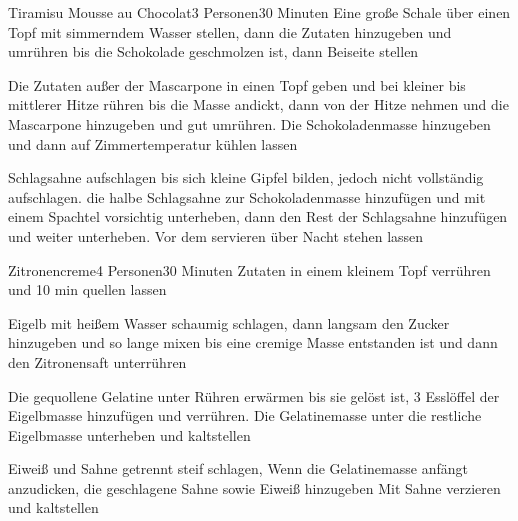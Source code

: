 \begin{recipe}{Tiramisu Mousse au Chocolat}{3 Personen}{30 Minuten}
Eine große Schale über einen Topf mit simmerndem Wasser stellen, dann die Zutaten hinzugeben und umrühren bis die Schokolade geschmolzen ist, dann Beiseite stellen

Die Zutaten außer der Mascarpone in einen Topf geben und bei kleiner bis mittlerer Hitze rühren bis die Masse andickt, dann von der Hitze nehmen und die Mascarpone hinzugeben und gut umrühren.
Die Schokoladenmasse hinzugeben und dann auf Zimmertemperatur kühlen lassen

Schlagsahne aufschlagen bis sich kleine Gipfel bilden, jedoch nicht vollständig aufschlagen.
die halbe Schlagsahne zur Schokoladenmasse hinzufügen und mit einem Spachtel vorsichtig unterheben, dann den Rest der Schlagsahne hinzufügen und weiter unterheben.
Vor dem servieren über Nacht stehen lassen
\end{recipe}


\begin{recipe}{Zitronencreme}{4 Personen}{30 Minuten}
Zutaten in einem kleinem Topf verrühren und 10 min quellen lassen

Eigelb mit heißem Wasser schaumig schlagen, dann langsam den Zucker hinzugeben und so lange mixen bis eine cremige Masse entstanden ist und dann den Zitronensaft unterrühren

\ing[]{}{}
Die gequollene Gelatine unter Rühren erwärmen bis sie gelöst ist, 3 Esslöffel der Eigelbmasse hinzufügen und verrühren. Die Gelatinemasse unter die restliche Eigelbmasse unterheben und kaltstellen

Eiweiß und Sahne getrennt steif schlagen,
Wenn die Gelatinemasse anfängt anzudicken, die geschlagene Sahne sowie Eiweiß hinzugeben
Mit Sahne verzieren und kaltstellen
\end{recipe}


